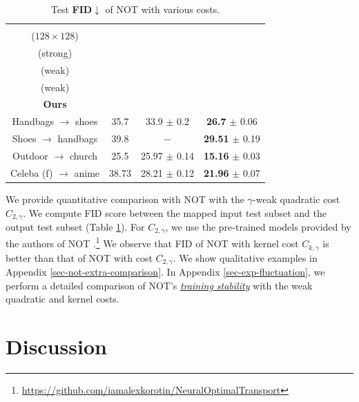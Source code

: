 \documentclass{article} %
\begin{document}
\begin{table}
\vspace{-1mm}\centering
\scriptsize
\begin{tabular}{|c|c|c|c|}
 \toprule
\makecell{\textbf{Datasets}\\($128\!\times\!128$)} & \makecell{$C_{2,0}$\\(strong) 
} & \makecell{$C_{2,\gamma}$\\ (weak)
} & \makecell{$C_{k,\gamma}$\\(weak)\\ \textbf{Ours}} \\ \midrule
Handbags $\rightarrow$ shoes & 35.7 & 33.9 $\pm$ 0.2 & \textbf{26.7} $\pm$ 0.06  \\ \midrule
Shoes $\rightarrow$ handbags & 39.8 & $-$ & \textbf{29.51} $\pm$ 0.19 \\  \midrule
Outdoor $\rightarrow$ church & 25.5 & 25.97 $\pm$ 0.14 & \textbf{15.16} $\pm$ 0.03 \\ \midrule
Celeba (f) $\rightarrow$ anime & 38.73 & 28.21 $\pm$ 0.12 & \textbf{21.96} $\pm$ 0.07 \\ \bottomrule
\end{tabular}
\caption{\centering Test \textbf{FID}$\downarrow$ of NOT with various costs.}\label{table-fid}\vspace{-5mm}
\end{table}We provide quantitative comparison with NOT with the $\gamma$-weak quadratic cost $C_{2,\gamma}$. We compute FID score \citep{heusel2017gans} between the mapped input test subset and the output test subset (Table \ref{table-fid}). For $C_{2,\gamma}$, we use the pre-trained models provided by the authors of NOT \citep[]{korotin2023neural}.\footnote{\url{https://github.com/iamalexkorotin/NeuralOptimalTransport}} We observe that FID of NOT with kernel cost $C_{k,\gamma}$ is better than that of NOT with cost $C_{2,\gamma}$. We show qualitative examples in
Appendix \ref{sec-not-extra-comparison}. In Appendix \ref{sec-exp-fluctuation}, we perform a detailed comparison of NOT's \underline{\textit{training stability}} with the weak quadratic and kernel costs.

\vspace{-2mm}\section{Discussion}
\label{sec-discussion}
\end{document}

